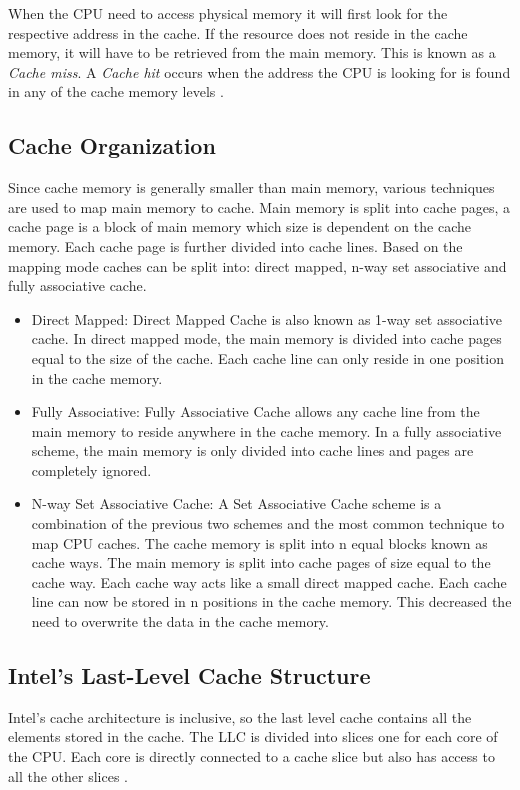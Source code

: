 \documentclass[10pt,a4paper,twoside]{book}
\begin{document}
When the CPU need to access physical memory it will first look for the respective address in the cache. If the resource does not reside in the cache memory, it will have to be retrieved from the main memory. This is known as a \textit{Cache miss}. A \textit{Cache hit} occurs when the address the CPU is looking for is found in any of the cache memory levels \cite{oren2015spy}.

\subsection{Cache Organization}
Since cache memory is generally smaller than main memory, various techniques are used to map main memory to cache. Main memory is split into cache pages, a cache page is a block of main memory which size is dependent on the cache memory. Each cache page is further divided into cache lines. Based on the mapping mode caches can be split into: direct mapped, n-way set associative and fully associative cache.
\begin{itemize}
\item Direct Mapped: Direct Mapped Cache is also known as 1-way set associative cache. In direct mapped mode, the main memory is divided into cache pages equal to the size of the cache. Each cache line can only reside in one position in the cache memory. 
\item Fully Associative: Fully Associative Cache allows any cache line from the main memory to reside anywhere in the cache memory. In a fully associative scheme, the main memory is only divided into cache lines and pages are completely ignored.
\item N-way Set Associative Cache: A Set Associative Cache scheme is a combination of the previous two schemes and the most common technique to map CPU caches. The cache memory is split into n equal blocks known as cache ways. The main memory is split into cache pages of size equal to the cache way. Each cache way acts like a small direct mapped cache. Each cache line can now be stored in n positions in the cache memory. This decreased the need to overwrite the data in the cache memory.
\end{itemize}

\subsection{Intel's Last-Level Cache Structure}
Intel's cache architecture is inclusive, so the last level cache contains all the elements stored in the cache. The LLC is divided into slices one for each core of the CPU. Each core is directly connected to a cache slice but also has access to all the other slices \cite{oren2015spy}.
\end{document}
